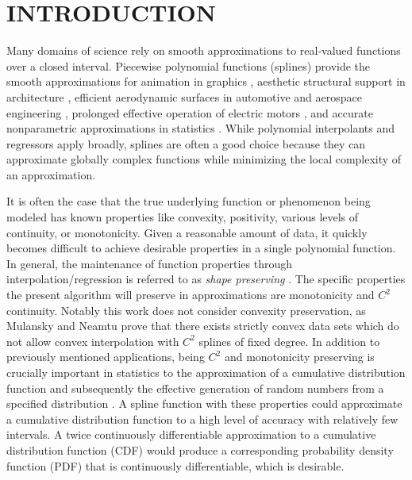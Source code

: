\section{INTRODUCTION}

Many domains of science rely on smooth approximations to real-valued
functions over a closed interval. Piecewise polynomial functions
(splines) provide the smooth approximations for animation in graphics
\cite{herman2015techniques,quint2003scalable}, aesthetic structural
support in architecture \cite{brennan2019measure}, efficient
aerodynamic surfaces in automotive and aerospace engineering
\cite{brennan2019measure}, prolonged effective operation of electric
motors \cite{berglund2009planning}, and accurate nonparametric
approximations in statistics \cite{knott2012interpolating}. While
polynomial interpolants and regressors apply broadly, splines are
often a good choice because they can approximate globally complex
functions while minimizing the local complexity of an approximation.

It is often the case that the true underlying function or phenomenon
being modeled has known properties like convexity, positivity, various
levels of continuity, or monotonicity. Given a reasonable amount of
data, it quickly becomes difficult to achieve desirable properties in
a single polynomial function. In general, the maintenance of function
properties through interpolation/regression is referred to as {\it
  shape preserving} \cite{fritsch1980monotone,gregory1985shape}. The
specific properties the present algorithm will preserve in
approximations are monotonicity and $C^2$ continuity.  Notably this
work does not consider convexity preservation, as Mulansky and Neamtu
\cite{mulansky1991existence} prove that there exists strictly convex
data sets which do not allow convex interpolation with $C^2$ splines
of fixed degree.  In addition to previously mentioned applications,
being $C^2$ and monotonicity preserving is crucially important in
statistics to the approximation of a cumulative distribution function
and subsequently the effective generation of random numbers from a
specified distribution \cite{ramsay1988monotone}.  A spline function
with these properties could approximate a cumulative distribution
function to a high level of accuracy with relatively few intervals. A
twice continuously differentiable approximation to a cumulative
distribution function (CDF) would produce a corresponding probability
density function (PDF) that is continuously differentiable, which is
desirable.

